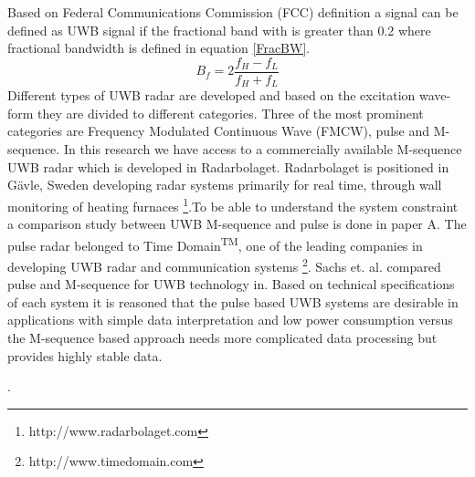 Based on Federal Communications Commission (FCC) definition a signal can be defined as UWB signal if the fractional band with is greater than 0.2 where fractional bandwidth is defined in equation \ref{FracBW}.
\begin{equation}\label{FracBW}
	B_{f} = 2\frac{f_{H}-f_{L}}{f_{H}+f_{L}}
\end{equation}
Different types of UWB radar are developed and based on the excitation wave-form they are divided to different categories. Three of the most prominent categories are Frequency Modulated Continuous Wave (FMCW), pulse and M-sequence. In this research we have access to a commercially available M-sequence UWB radar which is developed in Radarbolaget. Radarbolaget is positioned in G\"{a}vle, Sweden developing radar
systems primarily for real time, through wall monitoring of heating furnaces \footnote{http://www.radarbolaget.com}.To be able to understand the system constraint a comparison study between UWB M-sequence and pulse is done in paper A. The pulse radar belonged to Time Domain\textsuperscript{TM}, one of the leading companies in developing UWB radar and communication systems \footnote{http://www.timedomain.com}. Sachs et. al. compared pulse and M-sequence for UWB technology in\cite{sachs2003stimulation}. Based on technical specifications of each system it is reasoned that the pulse based
UWB systems are desirable in applications with simple data interpretation and low power consumption versus the M-sequence based approach needs more complicated data processing but provides highly stable data.


.